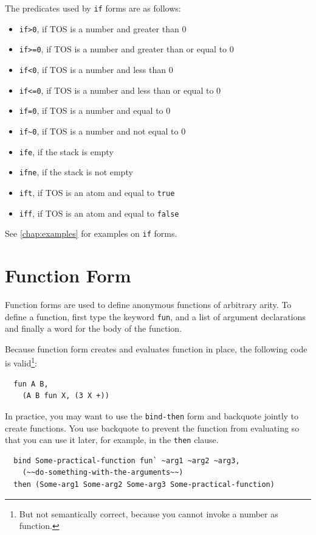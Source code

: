 \documentclass{report}
\begin{document}
The predicates used by \texttt{if} forms are as follows:
\begin{itemize}
\item \texttt{if>0}, if TOS is a number and greater than 0
\item \texttt{if>=0}, if TOS is a number and greater than or equal to 0
\item \texttt{if<0}, if TOS is a number and less than 0
\item \texttt{if<=0}, if TOS is a number and less than or equal to 0
\item \texttt{if=0}, if TOS is a number and equal to 0
\item \texttt{if\textasciitilde 0}, if TOS is a number and not equal to 0
\item \texttt{ife}, if the stack is empty
\item \texttt{ifne}, if the stack is not empty
\item \texttt{ift}, if TOS is an atom and equal to \texttt{true}
\item \texttt{iff}, if TOS is an atom and equal to \texttt{false}
\end{itemize}

See \autoref{chap:examples} for examples on \texttt{if} forms.

\section{Function Form}

Function forms are used to define anonymous functions of arbitrary arity. To define a function, first type the keyword \texttt{fun}, and a list of argument declarations and finally a word for the body of the function.

Because function form creates and evaluates function in place, the following code is valid\footnote{But not semantically correct, because you cannot invoke a number as function.}:
\begin{mdframed}[style=example]
\begin{verbatim}
  fun A B,
    (A B fun X, (3 X +))
\end{verbatim}
\end{mdframed}
In practice, you may want to use the \texttt{bind-then} form and backquote jointly to create functions. You use backquote to prevent the function from evaluating so that you can use it later, for example, in the \texttt{then} clause.

\begin{mdframed}[style=example]
\begin{verbatim}
  bind Some-practical-function fun` ~arg1 ~arg2 ~arg3,
    (~~do-something-with-the-arguments~~)
  then (Some-arg1 Some-arg2 Some-arg3 Some-practical-function)
\end{verbatim}
\end{mdframed}
\end{document}
